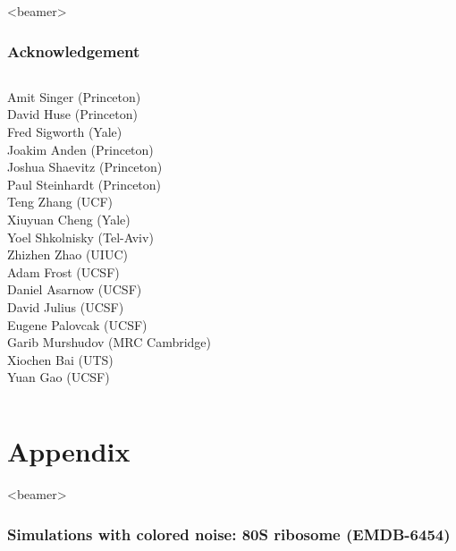 \documentclass{beamer}
\begin{document}
\begin{frame}<beamer>
\frametitle{Acknowledgement}
\begin{columns}
Amit Singer (Princeton)\\
David Huse (Princeton)\\
Fred Sigworth (Yale)\\
Joakim Anden (Princeton)\\
Joshua Shaevitz (Princeton)\\
Paul Steinhardt (Princeton)\\
Teng Zhang (UCF)\\
Xiuyuan Cheng (Yale)\\
Yoel Shkolnisky (Tel-Aviv) \\
Zhizhen Zhao (UIUC)\\

Adam Frost (UCSF)\\
Daniel Asarnow (UCSF)\\
David Julius (UCSF)\\
Eugene Palovcak (UCSF)\\
Garib Murshudov (MRC Cambridge)\\
Xiochen Bai (UTS)\\
Yuan Gao (UCSF)\\

\end{columns}
\end{frame}

\section{Appendix}

\begin{frame}<beamer>
\frametitle{Simulations with colored noise: 80S ribosome (EMDB-6454)}

\begin{figure}[]
\centering
{}
\vspace{-1mm}
\vspace{-1mm}

\label{fig:ims_6454_colored}
\end{figure}

\end{frame}
\end{document}

